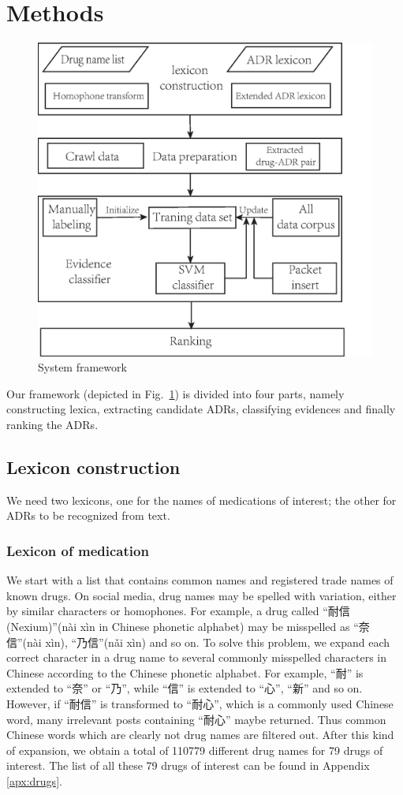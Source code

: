 \section{Methods}
\label{methods}
\begin{figure}
	\centering
	\includegraphics[width=0.6\columnwidth]{Fig1.eps}
	\caption{System framework}
	\label{fig:1}       %
\end{figure}
%
Our framework (depicted in Fig.~\ref{fig:1}) is divided into four parts, namely constructing lexica, extracting candidate ADRs, classifying evidences and finally ranking the ADRs.

\subsection{Lexicon construction}
\label{subsec:2.1}
We need two lexicons, one for the names of medications of interest; the other for ADRs to be recognized from text.

\subsubsection{Lexicon of medication}
\label{subsubsec:2.1.1} 
We start with a list that contains common names and registered trade names of known drugs. 
On social media, drug names may be spelled with variation, either by similar characters or 
homophones. For example, a drug called “耐信(Nexium)”(nài xìn in Chinese phonetic alphabet)  
may be misspelled as “奈信”(nài  xìn), “乃信”(nǎi xìn) and so on. To solve this problem, we expand each correct character in a drug name to several commonly misspelled characters in Chinese according to the Chinese phonetic alphabet. For example, “耐” is extended to “奈” or “乃”, while “信” is extended to “心”, “新” and so on. However, if “耐信” is transformed to “耐心”, which is a commonly used Chinese word, many irrelevant posts containing “耐心” maybe returned. Thus common Chinese words which are clearly not drug names are filtered out. After this kind of expansion, we obtain a total of 110779 different drug names for 79 drugs of interest. The list of all these 79 drugs of interest can be found in Appendix \ref{apx:drugs}.

